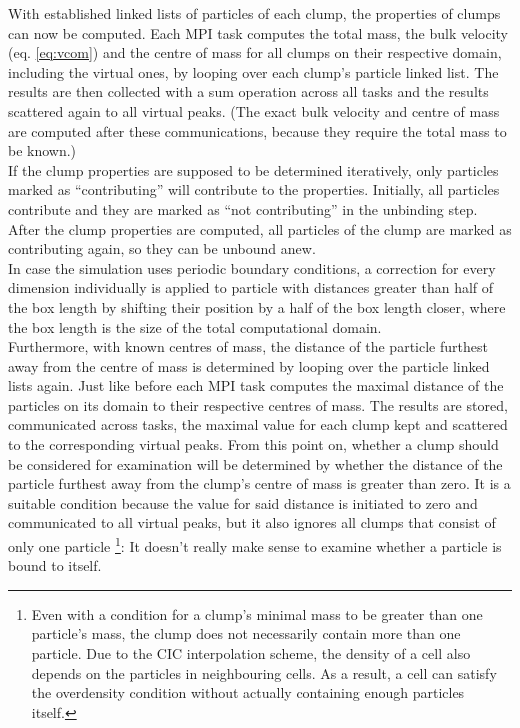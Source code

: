 With established linked lists of particles of each clump, the properties of clumps can now be computed.
Each MPI task computes the total mass, the bulk velocity (eq. \eqref{eq:vcom}) and the centre of mass for all clumps on their respective domain, including the virtual ones, by looping over each clump's particle linked list.
The results are then collected with a sum operation across all tasks and the results scattered again to all virtual peaks. 
(The exact bulk velocity and centre of mass are computed after these communications, because they require the total mass to be known.)\\
If the clump properties are supposed to be determined iteratively, only particles marked as ``contributing'' will contribute to the properties. 
Initially, all particles contribute and they are marked as ``not contributing'' in the unbinding step.
After the clump properties are computed, all particles of the clump are marked as contributing again, so they can be unbound anew.\\
In case the simulation uses periodic boundary conditions, a correction for every dimension individually is applied to particle with distances greater than half of the box length by shifting their position by a half of the box length closer, where the box length is the size of the total computational domain.\\
Furthermore, with known centres of mass, the distance of the particle furthest away from the centre of mass is determined by looping over the particle linked lists again.
Just like before each MPI task computes the maximal distance of the particles on its domain to their respective centres of mass. 
The results are stored, communicated across tasks, the maximal value for each clump kept and scattered to the corresponding virtual peaks.
From this point on, whether a clump should be considered for examination will be determined by whether the distance of the particle furthest away from the clump's centre of mass is greater than zero.
It is a suitable condition because the value for said distance is initiated to zero and communicated to all virtual peaks, but it also ignores all clumps that consist  of only one particle%
\footnote{
	Even with a condition for a clump's minimal mass to be greater than one particle's mass, the clump does not necessarily contain more than one particle.
	Due to the CIC interpolation scheme, the density of a cell also depends on the particles in neighbouring cells.
	As a result, a cell can satisfy the overdensity condition without actually containing enough particles itself.
}:
It doesn't really make sense to examine whether a particle is bound to itself.

















